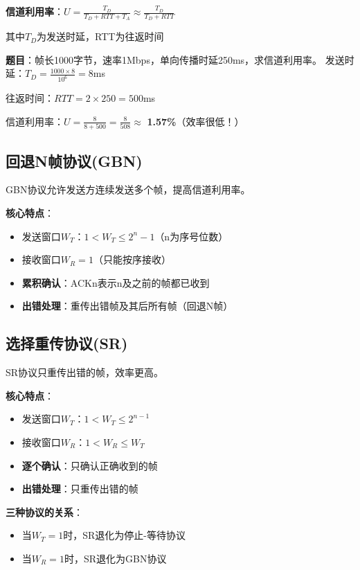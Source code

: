 \documentclass[12pt,a4paper,openany]{ctexbook}
\begin{document}
\begin{formulabox}
\textbf{信道利用率}：$U = \frac{T_D}{T_D + RTT + T_A} \approx \frac{T_D}{T_D + RTT}$

其中$T_D$为发送时延，RTT为往返时间
\end{formulabox}

\begin{examplebox}[例题3.2 停等协议效率]
\textbf{题目}：帧长1000字节，速率1Mbps，单向传播时延250ms，求信道利用率。
\tcblower
发送时延：$T_D = \frac{1000 \times 8}{10^6} = 8$ms

往返时间：$RTT = 2 \times 250 = 500$ms

信道利用率：$U = \frac{8}{8+500} = \frac{8}{508} \approx$ \textbf{1.57\%}（效率很低！）
\end{examplebox}

\subsection{回退N帧协议(GBN)}
GBN协议允许发送方连续发送多个帧，提高信道利用率。

\textbf{核心特点}：
\begin{itemize}[leftmargin=2em,itemsep=0pt]
    \item 发送窗口$W_T$：$1 < W_T \leq 2^n - 1$（n为序号位数）
    \item 接收窗口$W_R = 1$（只能按序接收）
    \item \textbf{累积确认}：ACKn表示n及之前的帧都已收到
    \item \textbf{出错处理}：重传出错帧及其后所有帧（回退N帧）
\end{itemize}

\subsection{选择重传协议(SR)}
SR协议只重传出错的帧，效率更高。

\textbf{核心特点}：
\begin{itemize}[leftmargin=2em,itemsep=0pt]
    \item 发送窗口$W_T$：$1 < W_T \leq 2^{n-1}$
    \item 接收窗口$W_R$：$1 < W_R \leq W_T$
    \item \textbf{逐个确认}：只确认正确收到的帧
    \item \textbf{出错处理}：只重传出错的帧
\end{itemize}

\begin{tipbox}
\textbf{三种协议的关系}：
\begin{itemize}[itemsep=0pt]
    \item 当$W_T = 1$时，SR退化为停止-等待协议
    \item 当$W_R = 1$时，SR退化为GBN协议
\end{itemize}
\end{tipbox}
\end{document}
